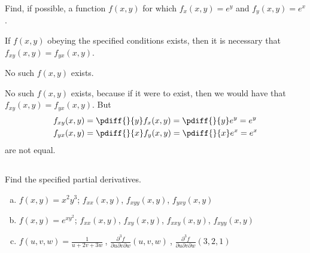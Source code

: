\begin{question}
Find, if possible, a function $f(x,y)$ for which $f_x(x,y)=e^y$ and
$f_y(x,y)=e^x$.
\end{question}

\begin{hint}
If $f(x,y)$ obeying the specified conditions exists, then it is necessary
that $f_{xy}(x,y)=f_{yx}(x,y)$.
\end{hint}

\begin{answer}
No such $f(x,y)$ exists.
\end{answer}

\begin{solution}
No such $f(x,y)$ exists, because if it were to exist, then we would have
that $f_{xy}(x,y)=f_{yx}(x,y)$. But
\begin{align*}
f_{xy}(x,y)&=\pdiff{}{y}f_x(x,y)=\pdiff{}{y}e^y=e^y \\
f_{yx}(x,y)&=\pdiff{}{x}f_y(x,y)=\pdiff{}{x}e^x=e^x 
\end{align*}
are not equal.
\end{solution}



\subsection*{\Procedural}

\begin{question}
Find the specified partial derivatives.
\begin{enumerate}[(a)]
\item
$f(x,y) = x^2y^3$;
$f_{xx}(x,y)$, $f_{xyy}(x,y)$, $f_{yxy}(x,y)$
\item 
$f(x,y) = e^{xy^2}$;
$f_{xx}(x,y)$, $f_{xy}(x,y)$, $f_{xxy}(x,y)$, $f_{xyy}(x,y)$
\item
$\displaystyle f(u,v,w) = \frac{1}{u+2v+3w}\ $, 
   $\displaystyle \frac{\partial^3 f}{\partial u\partial v\partial w}(u,v,w)\ $,
   $\displaystyle \frac{\partial^3 f}{\partial u\partial v\partial w}(3,2,1)$


\end{enumerate}
\end{question}


